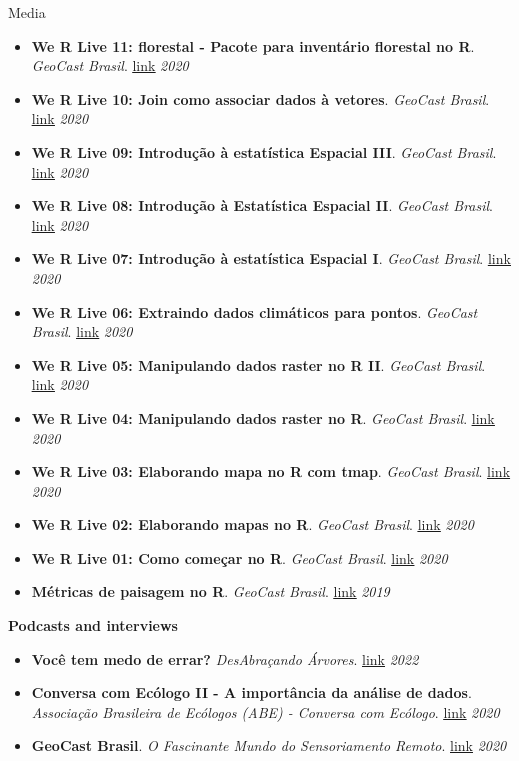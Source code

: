 \documentclass{resume}
\begin{document}
\begin{rSection}{Media}
\begin{itemize}
\item {\bf We R Live 11: florestal - Pacote para inventário florestal no R}. {\it GeoCast Brasil}. \href{https://youtu.be/xOgsVywKADI}{\underline{link}} \hfill{\em 2020}
\item {\bf We R Live 10: Join como associar dados à vetores}. {\it GeoCast Brasil}. \href{https://youtu.be/BvURukaIDM0}{\underline{link}} \hfill{\em 2020}
\item {\bf We R Live 09: Introdução à estatística Espacial III}. {\it GeoCast Brasil}. \href{https://youtu.be/eaR7pTsQFDQ}{\underline{link}} \hfill{\em 2020}
\item {\bf We R Live 08: Introdução à Estatística Espacial II}. {\it GeoCast Brasil}. \href{https://youtu.be/BCl_V-SpQec}{\underline{link}} \hfill{\em 2020}
\item {\bf We R Live 07: Introdução à estatística Espacial I}. {\it GeoCast Brasil}. \href{https://youtu.be/fHWD4qyKj84}{\underline{link}} \hfill{\em 2020}
\item {\bf We R Live 06: Extraindo dados climáticos para pontos}. {\it GeoCast Brasil}. \href{https://youtu.be/-_ODMFDU6ck}{\underline{link}} \hfill{\em 2020}
\item {\bf We R Live 05: Manipulando dados raster no R II}. {\it GeoCast Brasil}. \href{https://youtu.be/AKJo_Q0dsMI}{\underline{link}} \hfill{\em 2020}
\item {\bf We R Live 04: Manipulando dados raster no R}. {\it GeoCast Brasil}. \href{https://youtu.be/dFC9SuGLuX8}{\underline{link}} \hfill{\em 2020}
\item {\bf We R Live 03: Elaborando mapa no R com tmap}. {\it GeoCast Brasil}. \href{https://youtu.be/BmlM25XQ3QA}{\underline{link}} \hfill{\em 2020}
\item {\bf We R Live 02: Elaborando mapas no R}. {\it GeoCast Brasil}. \href{https://youtu.be/eHht0n3Ppcg}{\underline{link}} \hfill{\em 2020}
\item {\bf We R Live 01: Como começar no R}. {\it GeoCast Brasil}. \href{https://youtu.be/ZORFVdwtJ1U}{\underline{link}} \hfill{\em 2020}
\item {\bf Métricas de paisagem no R}. {\it GeoCast Brasil}. \href{https://youtu.be/RCTrLx_33D8}{\underline{link}} \hfill{\em 2019}
\end{itemize} 

{\bf Podcasts and interviews}
\begin{itemize} 
\item {\bf Você tem medo de errar?} {\it DesAbraçando Árvores}. \href{https://www.desabrace.com.br/092-voce-tem-medo-de-errar/}{\underline{link}} \hfill{\em 2022} 
\item {\bf Conversa com Ecólogo II - A importância da análise de dados}. {\it Associação Brasileira de Ecólogos (ABE) - Conversa com Ecólogo}. \href{https://www.instagram.com/p/CFQVjMtH6qk/}{\underline{link}} \hfill{\em 2020}
\item {\bf GeoCast Brasil}. {\it O Fascinante Mundo do Sensoriamento Remoto}. \href{https://open.spotify.com/episode/0Kn5k9039vM8bZgb4YdlJJ?si=S5hfhNc6S6GfDFaJSsaQDA}{\underline{link}} \hfill{\em 2020}
\end{itemize} 


\end{rSection}
\end{document}
